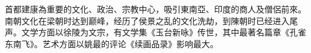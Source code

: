 首都建康為重要的文化、政治、宗教中心，吸引東南亞、印度的商人及僧侶前來。南朝文化在梁朝时达到巅峰，经历了侯景之乱的文化洗劫，到陳朝时已经进入尾声。文学方面以徐陵为文宗，有文学集《玉台新咏》传世，其中最著名篇章《孔雀东南飞》。艺术方面以姚最的评论《续画品录》影响最大。









